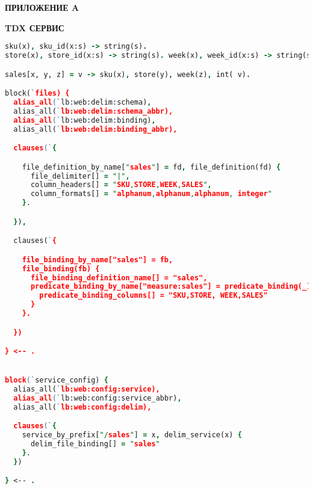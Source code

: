 \begin{flushright}
\textbf{\MakeUppercase{Приложение A}}
\end{flushright}
\begin{center}
\textbf{\MakeUppercase{TDX сервис}}
\end{center}

\begin{lstlisting}[language=Prolog]
sku(x), sku_id(x:s) -> string(s).
store(x), store_id(x:s) -> string(s). week(x), week_id(x:s) -> string(s).

sales[x, y, z] = v -> sku(x), store(y), week(z), int( v).

block(`files) {
  alias_all(`lb:web:delim:schema),
  alias_all(`lb:web:delim:schema_abbr),
  alias_all(`lb:web:delim:binding),
  alias_all(`lb:web:delim:binding_abbr),

  clauses(`{

    file_definition_by_name["sales"] = fd, file_definition(fd) {
      file_delimiter[] = "|",
      column_headers[] = "SKU,STORE,WEEK,SALES",
      column_formats[] = "alphanum,alphanum,alphanum, integer"
    }.

  }),

  clauses(`{

    file_binding_by_name["sales"] = fb,
    file_binding(fb) {
      file_binding_definition_name[] = "sales",
      predicate_binding_by_name["measure:sales"] = predicate_binding(_) {
        predicate_binding_columns[] = "SKU,STORE, WEEK,SALES"
      }
    }.

  })

} <-- .


block(`service_config) {
  alias_all(`lb:web:config:service),
  alias_all(`lb:web:config:service_abbr),
  alias_all(`lb:web:config:delim),

  clauses(`{
    service_by_prefix["/sales"] = x, delim_service(x) {
      delim_file_binding[] = "sales"
    }.
  })

} <-- .
\end{lstlisting}
